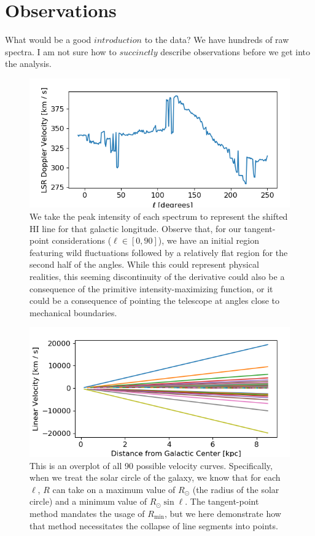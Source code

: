 \documentclass[12pt]{article}
\begin{document}
\section{Observations}

\quad \quad What would be a good $introduction$ to the data? We have hundreds of raw spectra. I am not sure how to $succinctly$ describe observations before we get into the analysis.

\begin{figure}
	\centering
	\includegraphics[width=.9\linewidth]{Doppler_collection}
	\caption{We take the peak intensity of each spectrum to represent the shifted HI line for that galactic longitude.  Observe that, for our tangent-point considerations ($\ell \in [0, 90]$), we have an initial region featuring wild fluctuations followed by a relatively flat region for the second half of the angles. While this could represent physical realities, this seeming discontinuity of the derivative could also be a consequence of the primitive intensity-maximizing function, or it could be a consequence of pointing the telescope at angles close to mechanical boundaries.}
	\label{fig:Dopp_collection}
\end{figure}

\begin{figure}
	\centering
	\includegraphics[width=.9\linewidth]{tangentPoint_dispersion}
	\caption{This is an overplot of all 90 possible velocity curves. Specifically, when we treat the solar circle of the galaxy, we know that for each $\ell$, $R$ can take on a maximum value of $R_\odot$ (the radius of the solar circle) and a minimum value of $R_\odot \sin \ell$. The tangent-point method mandates the usage of $R_\text{min}$, but we here demonstrate how that method necessitates the collapse of line segments into points.}
	\label{fig:TP_disp}
\end{figure}
\end{document}

